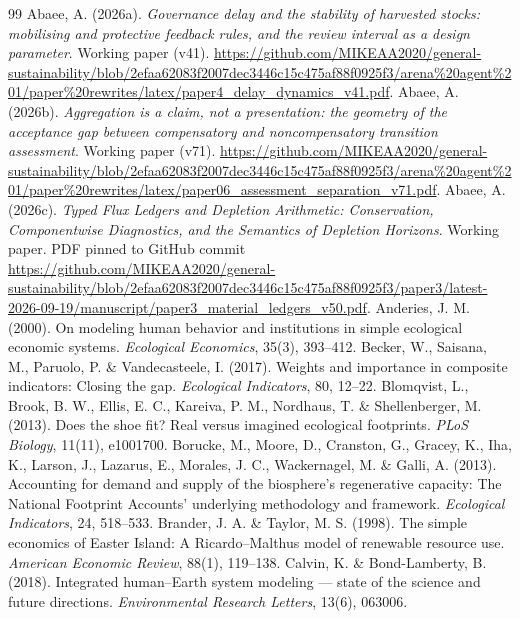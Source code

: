\begin{thebibliography}{99}
 Abaee, A. (2026a). \emph{Governance delay and the stability of harvested stocks: mobilising and protective feedback rules, and the review interval as a design parameter}. Working paper (v41). \url{https://github.com/MIKEAA2020/general-sustainability/blob/2efaa62083f2007dec3446c15c475af88f0925f3/arena%20agent%201/paper%20rewrites/latex/paper4_delay_dynamics_v41.pdf}.
 Abaee, A. (2026b). \emph{Aggregation is a claim, not a presentation: the geometry of the acceptance gap between compensatory and noncompensatory transition assessment}. Working paper (v71). \url{https://github.com/MIKEAA2020/general-sustainability/blob/2efaa62083f2007dec3446c15c475af88f0925f3/arena%20agent%201/paper%20rewrites/latex/paper06_assessment_separation_v71.pdf}.
 Abaee, A. (2026c). \emph{Typed Flux Ledgers and Depletion Arithmetic: Conservation, Componentwise Diagnostics, and the Semantics of Depletion Horizons}. Working paper. PDF pinned to GitHub commit \url{https://github.com/MIKEAA2020/general-sustainability/blob/2efaa62083f2007dec3446c15c475af88f0925f3/paper3/latest-2026-09-19/manuscript/paper3_material_ledgers_v50.pdf}.
 Anderies, J. M. (2000). On modeling human behavior and institutions in simple ecological economic systems. \emph{Ecological Economics}, 35(3), 393--412.
 Becker, W., Saisana, M., Paruolo, P. \& Vandecasteele, I. (2017). Weights and importance in composite indicators: Closing the gap. \emph{Ecological Indicators}, 80, 12--22.
 Blomqvist, L., Brook, B. W., Ellis, E. C., Kareiva, P. M., Nordhaus, T. \& Shellenberger, M. (2013). Does the shoe fit? Real versus imagined ecological footprints. \emph{PLoS Biology}, 11(11), e1001700.
 Borucke, M., Moore, D., Cranston, G., Gracey, K., Iha, K., Larson, J., Lazarus, E., Morales, J. C., Wackernagel, M. \& Galli, A. (2013). Accounting for demand and supply of the biosphere's regenerative capacity: The National Footprint Accounts' underlying methodology and framework. \emph{Ecological Indicators}, 24, 518--533.
 Brander, J. A. \& Taylor, M. S. (1998). The simple economics of Easter Island: A Ricardo--Malthus model of renewable resource use. \emph{American Economic Review}, 88(1), 119--138.
 Calvin, K. \& Bond-Lamberty, B. (2018). Integrated human--Earth system modeling --- state of the science and future directions. \emph{Environmental Research Letters}, 13(6), 063006.

\end{thebibliography}
